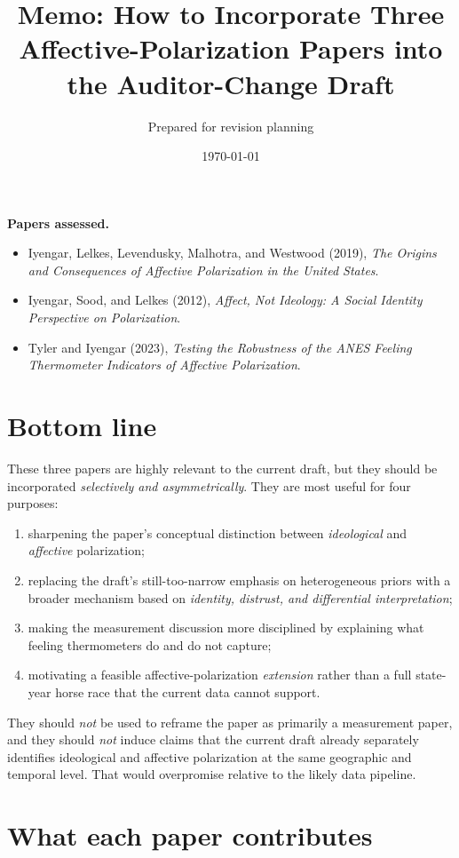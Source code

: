 \documentclass[12pt]{article}
\title{Memo: How to Incorporate Three Affective-Polarization Papers into the Auditor-Change Draft}
\author{Prepared for revision planning}
\date{\today}
\begin{document}
\maketitle

\noindent\textbf{Papers assessed.}
\begin{itemize}
    \item Iyengar, Lelkes, Levendusky, Malhotra, and Westwood (2019), \emph{The Origins and Consequences of Affective Polarization in the United States}.
    \item Iyengar, Sood, and Lelkes (2012), \emph{Affect, Not Ideology: A Social Identity Perspective on Polarization}.
    \item Tyler and Iyengar (2023), \emph{Testing the Robustness of the ANES Feeling Thermometer Indicators of Affective Polarization}.
\end{itemize}

\section{Bottom line}

These three papers are highly relevant to the current draft, but they should be incorporated \emph{selectively and asymmetrically}. They are most useful for four purposes:
\begin{enumerate}
    \item sharpening the paper's conceptual distinction between \emph{ideological} and \emph{affective} polarization;
    \item replacing the draft's still-too-narrow emphasis on heterogeneous priors with a broader mechanism based on \emph{identity, distrust, and differential interpretation};
    \item making the measurement discussion more disciplined by explaining what feeling thermometers do and do not capture;
    \item motivating a feasible affective-polarization \emph{extension} rather than a full state-year horse race that the current data cannot support.
\end{enumerate}

They should \emph{not} be used to reframe the paper as primarily a measurement paper, and they should \emph{not} induce claims that the current draft already separately identifies ideological and affective polarization at the same geographic and temporal level. That would overpromise relative to the likely data pipeline.

\section{What each paper contributes}
\end{document}
